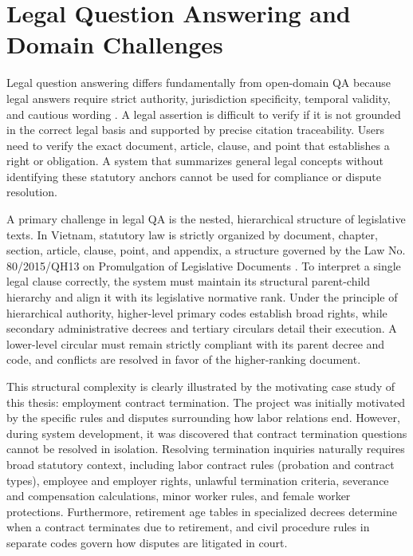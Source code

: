 \section{Legal Question Answering and Domain Challenges}
Legal question answering differs fundamentally from open-domain QA because legal answers require strict authority, jurisdiction specificity, temporal validity, and cautious wording \cite{zhong2020legalqa}. A legal assertion is difficult to verify if it is not grounded in the correct legal basis and supported by precise citation traceability. Users need to verify the exact document, article, clause, and point that establishes a right or obligation. A system that summarizes general legal concepts without identifying these statutory anchors cannot be used for compliance or dispute resolution.

A primary challenge in legal QA is the nested, hierarchical structure of legislative texts. In Vietnam, statutory law is strictly organized by document, chapter, section, article, clause, point, and appendix, a structure governed by the Law No. 80/2015/QH13 on Promulgation of Legislative Documents \cite{vietnam2015law80}. To interpret a single legal clause correctly, the system must maintain its structural parent-child hierarchy and align it with its legislative normative rank. Under the principle of hierarchical authority, higher-level primary codes establish broad rights, while secondary administrative decrees and tertiary circulars detail their execution. A lower-level circular must remain strictly compliant with its parent decree and code, and conflicts are resolved in favor of the higher-ranking document.

This structural complexity is clearly illustrated by the motivating case study of this thesis: employment contract termination. The project was initially motivated by the specific rules and disputes surrounding how labor relations end. However, during system development, it was discovered that contract termination questions cannot be resolved in isolation. Resolving termination inquiries naturally requires broad statutory context, including labor contract rules (probation and contract types), employee and employer rights, unlawful termination criteria, severance and compensation calculations, minor worker rules, and female worker protections. Furthermore, retirement age tables in specialized decrees determine when a contract terminates due to retirement, and civil procedure rules in separate codes govern how disputes are litigated in court.


